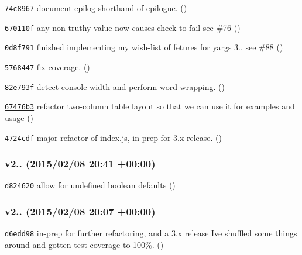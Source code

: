\begin{DoxyItemize}
\item \href{https://github.com/bcoe/yargs/commit/74c8967c340c204a0a7edf8a702b6f46c2705435}{\tt 74c8967} document epilog shorthand of epilogue. ()
\item \href{https://github.com/bcoe/yargs/commit/670110fc01bedc4831b6fec6afac54517d5a71bc}{\tt 670110f} any non-\/truthy value now causes check to fail see \#76 ()
\item \href{https://github.com/bcoe/yargs/commit/0d8f791a33c11ced4cd431ea8d3d3a337d456b56}{\tt 0d8f791} finished implementing my wish-\/list of fetures for yargs 3.. see \#88 ()
\item \href{https://github.com/bcoe/yargs/commit/5768447447c4c8e8304f178846206ce86540f063}{\tt 5768447} fix coverage. ()
\item \href{https://github.com/bcoe/yargs/commit/82e793f3f61c41259eaacb67f0796aea2cf2aaa0}{\tt 82e793f} detect console width and perform word-\/wrapping. ()
\item \href{https://github.com/bcoe/yargs/commit/67476b37eea07fee55f23f35b9e0c7d76682b86d}{\tt 67476b3} refactor two-\/column table layout so that we can use it for examples and usage ()
\item \href{https://github.com/bcoe/yargs/commit/4724cdfcc8e37ae1ca3dcce9d762f476e9ef4bb4}{\tt 4724cdf} major refactor of index.\+js, in prep for 3.\+x release. ()
\end{DoxyItemize}

\subsubsection*{v2.. (2015/02/08 20\+:41 +00\+:00)}


\begin{DoxyItemize}
\item \href{https://github.com/bcoe/yargs/commit/d824620493df4e63664af1fe320764dd1a9244e6}{\tt d824620} allow for undefined boolean defaults ()
\end{DoxyItemize}

\subsubsection*{v2.. (2015/02/08 20\+:07 +00\+:00)}


\begin{DoxyItemize}
\item \href{https://github.com/bcoe/yargs/commit/d6edd9848826e7389ed1393858c45d03961365fd}{\tt d6edd98} in-\/prep for further refactoring, and a 3.\+x release I\textquotesingle{}ve shuffled some things around and gotten test-\/coverage to 100\%. ()
\end{DoxyItemize}

